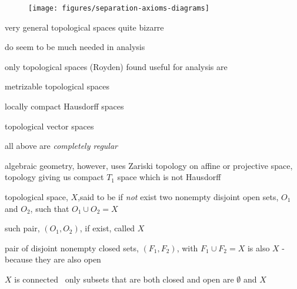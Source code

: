 \documentclass[17pt,landscape]{foils}
\begin{document}
{{\begin{figure}
\begin{center}

	\texttt{[image: figures/separation-axioms-diagrams]}%
		\label{fig:diagrams for separation axioms for topological spaces}
\end{center}
\end{figure}
\vfill



\bit
	\item very general topological spaces quite bizarre

	\bit
		\item do  seem to be much needed in analysis
	\eit

	\vitem only topological spaces (Royden) found useful for analysis are

	\bit
		\item metrizable topological spaces
		\item locally compact Hausdorff spaces%
		\item topological vector spaces
	\eit

	\vitem all above are \emph{completely regular}

	\vfill
	\vvitem algebraic geometry, however, uses Zariski topology on affine or projective space,
		topology giving us compact $T_1$ space which is not Hausdorff%
\eit



\bit
	\item topological space, $X$,said to be  if \emph{not} exist two nonempty disjoint open sets, $O_1$ and $O_2$,
		such that $O_1\cup O_2 = X$

	\bit
		\vitem such pair, $(O_1, O_2)$, if exist, called  $X$

		\vitem pair of disjoint nonempty closed sets, $(F_1,F_2)$, with $F_1\cup F_2=X$
			is also  $X$ - because they are also open
	\eit

	\vitem $X$ is connected \iaoi\ only subsets that are both closed and open are $\emptyset$ and $X$

}}
\end{document}
